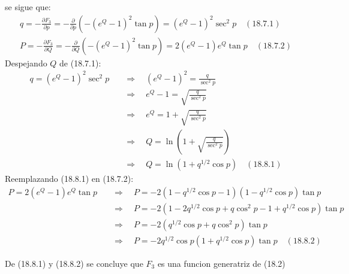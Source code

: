 \documentclass[a4paper]{article}
\begin{document}
\begin{answer}[Punto 4]
\begin{itemize}
            se sigue que:
            \begin{align*}
                q = - \frac{\partial F_3}{\partial p} = -\frac{\partial}{\partial p} \left(-\left(e^Q-1\right)^2 \tan p\right) = \left(e^Q-1\right)^2 \sec^2 p \quad (18.7.1)\\
                P = -\frac{\partial F_3}{\partial Q} = -\frac{\partial}{\partial Q} \left(-\left(e^Q-1\right)^2 \tan p\right) = 2\left(e^Q-1\right)e^Q \tan p \quad (18.7.2)
            \end{align*}
            Despejando $Q$ de (18.7.1):
            \begin{align*}
                q = \left(e^Q-1\right)^2 \sec^2 p \quad &\Rightarrow \quad \left(e^Q-1\right)^2 = \frac q{\sec^2 p}\\
                &\Rightarrow \quad e^Q-1 =  \sqrt{\frac q{\sec^2 p}}\\
                &\Rightarrow \quad e^Q = 1 + \sqrt{\frac q{\sec^2 p}}\\
                &\Rightarrow \quad Q = \ln \left(1 + \sqrt{\frac q{\sec^2 p}}\right)\\
                &\Rightarrow \quad Q = \ln \left(1 + q^{1/2} \cos p\right) \quad (18.8.1)
            \end{align*}
            Reemplazando (18.8.1) en (18.7.2):
            \begin{align*}
                P = 2\left(e^Q-1\right)e^Q \tan p \quad &\Rightarrow \quad P = -2\left(1 - q^{1/2} \cos p -1\right)\left(1 - q^{1/2} \cos p\right) \tan p\\
                &\Rightarrow \quad P = -2(1 - 2q^{1/2} \cos p + q \cos^2 p -1 + q^{1/2} \cos p) \tan p\\
                &\Rightarrow \quad P = -2  \left(q^{1/2}\cos p + q\cos^2 p\right) \tan p\\
                &\Rightarrow \quad P = -2q^{1/2} \cos p \left(1 + q^{1/2} \cos p\right) \tan p \quad (18.8.2)
            \end{align*}

            De (18.8.1) y (18.8.2) se concluye que $F_3$ es una funcion generatriz de (18.2) 
        \end{itemize}
    \end{answer}
    
\end{document}
